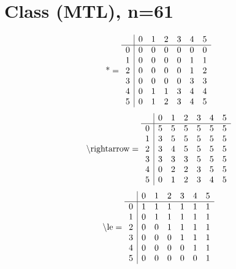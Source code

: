 \documentclass[11pt]{article}
\begin{document}
\section{Class (MTL), n=61}
\[\text{*} = 
\begin{array}{r | r r r r r r}
 & 0 & 1 & 2 & 3 & 4 & 5 \\ \hline
0 & 0 & 0 & 0 & 0 & 0 & 0 \\
1 & 0 & 0 & 0 & 0 & 1 & 1 \\
2 & 0 & 0 & 0 & 0 & 1 & 2 \\
3 & 0 & 0 & 0 & 0 & 3 & 3 \\
4 & 0 & 1 & 1 & 3 & 4 & 4 \\
5 & 0 & 1 & 2 & 3 & 4 & 5 \\
\end{array}
\]
\[\text{\textbackslash rightarrow} = 
\begin{array}{r | r r r r r r}
 & 0 & 1 & 2 & 3 & 4 & 5 \\ \hline
0 & 5 & 5 & 5 & 5 & 5 & 5 \\
1 & 3 & 5 & 5 & 5 & 5 & 5 \\
2 & 3 & 4 & 5 & 5 & 5 & 5 \\
3 & 3 & 3 & 3 & 5 & 5 & 5 \\
4 & 0 & 2 & 2 & 3 & 5 & 5 \\
5 & 0 & 1 & 2 & 3 & 4 & 5 \\
\end{array}
\]
\[\text{\textbackslash le} = 
\begin{array}{r | r r r r r r}
 & 0 & 1 & 2 & 3 & 4 & 5 \\ \hline
0 & 1 & 1 & 1 & 1 & 1 & 1 \\
1 & 0 & 1 & 1 & 1 & 1 & 1 \\
2 & 0 & 0 & 1 & 1 & 1 & 1 \\
3 & 0 & 0 & 0 & 1 & 1 & 1 \\
4 & 0 & 0 & 0 & 0 & 1 & 1 \\
5 & 0 & 0 & 0 & 0 & 0 & 1 \\
\end{array}
\]
\end{document}
